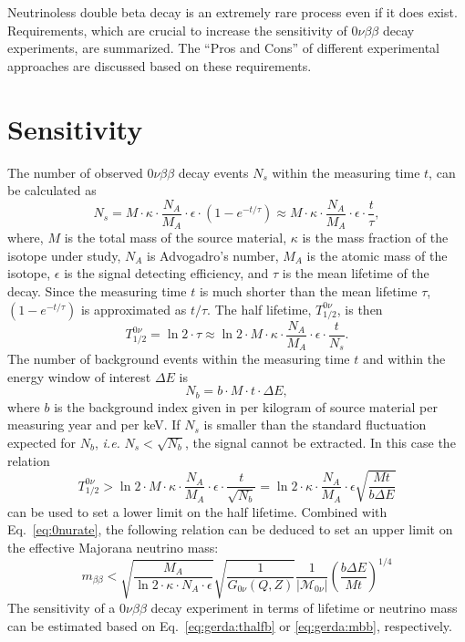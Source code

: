 Neutrinoless double beta decay is an extremely rare process even if it does exist. Requirements, which are crucial to increase the sensitivity of $0\nu\beta\beta$ decay experiments, are summarized. The ``Pros and Cons'' of different experimental approaches are discussed based on these requirements.

\section{Sensitivity}
\label{sec:sensi}
The number of observed $0\nu\beta\beta$ decay events $N_{s}$ within the measuring time $t$, can be calculated as
\begin{equation}
  \label{eq:gerda:ns}
  N_{s} = M \cdot \kappa \cdot \frac{N_{A}}{M_{A}} \cdot \epsilon \cdot (1 - e^{-t/\tau}) \approx M \cdot \kappa \cdot \frac{N_{A}}{M_{A}} \cdot \epsilon \cdot \frac{t}{\tau},
\end{equation}
where, $M$ is the total mass of the source material, $\kappa$ is the mass fraction of the isotope under study, $N_{A}$ is Advogadro's number, $M_{A}$ is the atomic mass of the isotope, $\epsilon$ is the signal detecting efficiency, and $\tau$ is the mean lifetime of the decay. Since the measuring time $t$ is much shorter than the mean lifetime $\tau$, $(1 - e^{-t/\tau})$ is approximated as $t/\tau$. The half lifetime, $T^{0\nu}_{1/2}$, is then
\begin{equation}
  \label{eq:gerda:thalf}
  T^{0\nu}_{1/2} = \ln2 \cdot \tau \approx \ln2 \cdot M \cdot \kappa \cdot \frac{N_{A}}{M_{A}} \cdot \epsilon \cdot \frac{t}{N_{s}}.
\end{equation}
The number of background events within the measuring time $t$ and within the energy window of interest $\Delta E$ is 
\begin{equation}
  \label{eq:gerda:nb}
  N_{b} = b \cdot M \cdot t \cdot \Delta E,
\end{equation}
where $b$ is the background index given in per kilogram of source material per measuring year and per keV. If $N_{s}$ is smaller than the standard fluctuation expected for $N_{b}$, \textit{i.e.} $N_{s}<\sqrt{N_{b}}$, the signal cannot be extracted. In this case the relation
\begin{equation}
  \label{eq:gerda:thalfb}
  T^{0\nu}_{1/2} > \ln2 \cdot M \cdot \kappa \cdot \frac{N_{A}}{M_{A}} \cdot \epsilon \cdot \frac{t}{\sqrt{N_{b}}} = \ln2 \cdot \kappa \cdot \frac{N_{A}}{M_{A}} \cdot \epsilon \sqrt{\frac{M t}{b \Delta E}}
\end{equation}
can be used to set a lower limit on the half lifetime. Combined with Eq.~\ref{eq:0nurate}, the following relation can be deduced to set an upper limit on the effective Majorana neutrino mass:
\begin{equation}
  \label{eq:gerda:mbb}
  m_{\beta\beta} < \sqrt{\frac{M_{A}}{\ln2 \cdot \kappa \cdot N_{A} \cdot \epsilon}} \sqrt{\frac{1}{G_{0\nu}(Q,Z)}} \frac{1}{|\mathcal{M}_{0\nu}|} (\frac{b \Delta E}{M t})^{1/4}
\end{equation}
The sensitivity of a
$0\nu\beta\beta$ decay experiment in terms of lifetime or neutrino mass can be estimated based on Eq.~\ref{eq:gerda:thalfb} or \ref{eq:gerda:mbb}, respectively.

